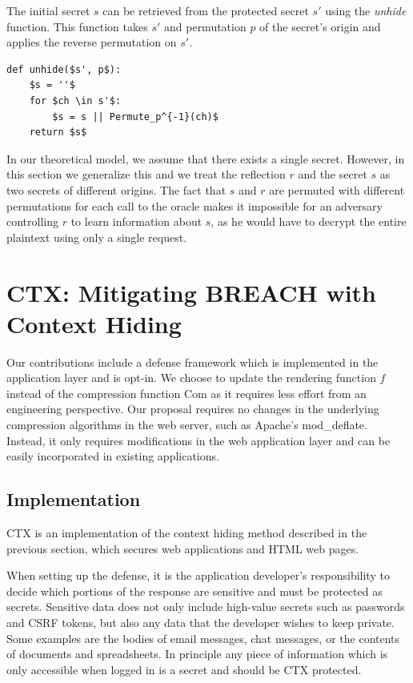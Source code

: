 The initial secret $s$ can be retrieved from the protected secret $s'$ using the
\textit{unhide} function. This function takes $s'$ and permutation $p$ of the
secret's origin and applies the reverse permutation on $s'$.

\begin{lstlisting}[texcl,mathescape,basicstyle=\small]
def unhide($s', p$):
    $s = ''$
    for $ch \in s'$:
        $s = s || Permute_p^{-1}(ch)$
    return $s$
\end{lstlisting}

In our theoretical model, we assume that there exists a single secret. However,
in this section we generalize this and we treat the reflection $r$ and the
secret $s$ as two secrets of different origins. The fact that
$s$ and $r$ are permuted with different permutations for each call to the oracle
makes it impossible for an adversary controlling $r$ to learn
information about $s$, as he would have to decrypt the entire plaintext using
only a single request.

\section{CTX: Mitigating BREACH with Context Hiding }\label{sec:ctx}

Our contributions include a defense framework which is implemented in the
application layer and is opt-in. We choose to update the rendering function $f$
instead of the compression function $\textrm{Com}$ as it requires less effort
from an engineering perspective. Our proposal requires no changes in the
underlying compression algorithms in the web server, such as Apache's
mod\_deflate. Instead, it only requires modifications in the web application
layer and can be easily incorporated in existing applications.

\subsection{Implementation}
CTX is an implementation of the context hiding method described in the previous
section, which secures web applications and HTML web pages.

When setting up the defense, it is the application developer's responsibility to
decide which portions of the response are sensitive and must be protected as
secrets. Sensitive data does not only include high-value secrets such as
passwords and CSRF tokens, but also any data that the developer wishes to keep
private. Some examples are the bodies of email messages, chat messages, or the
contents of documents and spreadsheets. In principle any piece of information
which is only accessible when logged in is a secret and should be CTX protected.

